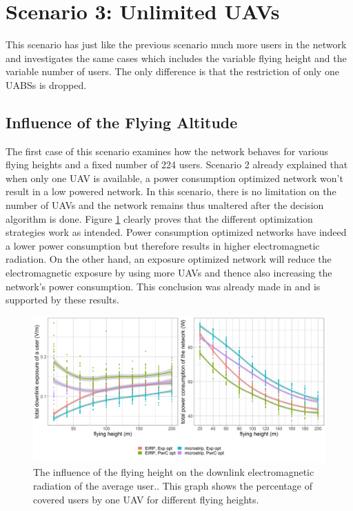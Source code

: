 \section{Scenario 3: Unlimited \gls{UAV}s}
\label{s3}

This scenario has just like the previous scenario much more users in the network 
and investigates the same cases which includes the variable flying height and the variable number of  users.
The only difference is that the restriction of only one \gls{UABS}s is dropped.

\subsection{Influence of the Flying Altitude}
\label{S3A}

The first case of this scenario examines how the network behaves for various flying heights and a fixed number of 224 users.
Scenario 2 already explained that when only one \gls{UAV} is available, a power consumption optimized network won’t result in a low 
powered network. In this scenario, there is no limitation on the number of \gls{UAV}s and the network remains thus unaltered after the decision 
algorithm is done. Figure \ref{fig:s3a_dlAndPc} clearly proves that the different optimization strategies work as intended.
Power consumption optimized networks have indeed a lower power consumption but therefore results in higher electromagnetic radiation.
On the other hand, an exposure optimized network will reduce the electromagnetic exposure by using more \gls{UAV}s and thence also increasing the network's power consumption.
This conclusion was already made  in \cite{J1} and is supported by these results.

\begin{figure}[h!]
  \includegraphics[width=\textwidth]{../results/s3/fhvsdlAndPc.png}
  \caption{The influence of the flying height on the downlink electromagnetic radiation of the average user.. This graph shows the percentage of covered users by one \gls{UAV} for different flying heights.}
  \label{fig:s3a_dlAndPc}
\end{figure}

